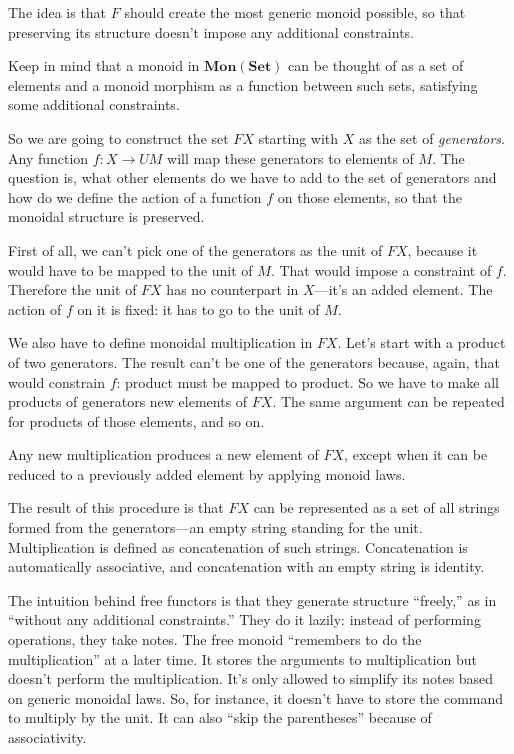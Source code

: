 \documentclass[DaoFP]{subfiles}
\begin{document}
The idea is that $F$ should create the most generic monoid possible, so that preserving its structure doesn't impose any additional constraints. 

Keep in mind that a monoid in  $\mathbf{Mon}(\mathbf{Set})$ can be thought of as a set of elements and a monoid morphism as a function between such sets, satisfying some additional constraints. 

So we are going to construct the set $F X$ starting with $X$ as the set of \emph{generators}.  Any function $f \colon X \to U M$ will map these generators to elements of $M$. The question is, what other elements do we have to add to the set of generators and how do we define the action of a function $f$ on those elements, so that the monoidal structure is preserved. 

First of all, we can't pick one of the generators as the unit of $F X$, because it would have to be mapped to the unit of $M$. That would impose a constraint of $f$. Therefore the unit of $F X$ has no counterpart in $X$---it's an added element. The action of $f$ on it is fixed: it has to go to the unit of $M$. 

We also have to define monoidal multiplication in $F X$. Let's start with a product of two generators. The result can't be one of the generators because, again, that would constrain $f$: product must be mapped to product. So we have to make all products of generators new elements of $F X$. The same argument can be repeated for products of those elements, and so on. 

Any new multiplication produces a new element of $F X$, except when it can be reduced to a previously added element by applying monoid laws. 

The result of this procedure is that $F X$ can be represented as a set of all strings formed from the generators---an empty string standing for the unit. Multiplication is defined as concatenation of such strings. Concatenation is automatically associative, and concatenation with an empty string is identity. 

The intuition behind free functors is that they generate structure ``freely,'' as in ``without any additional constraints.'' They do it lazily: instead of performing operations, they take notes. The free monoid ``remembers to do the multiplication'' at a later time. It stores the arguments to multiplication but doesn't perform the multiplication. It's only allowed to simplify its notes based on generic monoidal laws. So, for instance, it doesn't have to store the command to multiply by the unit. It can also ``skip the parentheses'' because of associativity. 
\end{document}
